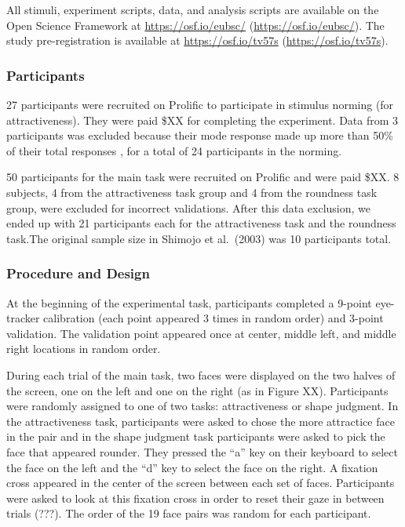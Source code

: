 \documentclass[
  english,
  man,floatsintext]{apa6}
\begin{document}
All stimuli, experiment scripts, data, and analysis scripts are available on the Open Science Framework at \url{https://osf.io/eubsc/} (\url{https://osf.io/eubsc/}). The study pre-registration is available at \url{https://osf.io/tv57s} (\url{https://osf.io/tv57s}).

\hypertarget{participants-5}{%
\subsubsection{Participants}\label{participants-5}}

27 participants were recruited on Prolific to participate in stimulus norming (for attractiveness). They were paid \$XX for completing the experiment. Data from 3 participants was excluded because their mode response made up more than 50\% of their total responses , for a total of 24 participants in the norming.

50 participants for the main task were recruited on Prolific and were paid \$XX. 8 subjects, 4 from the attractiveness task group and 4 from the roundness task group, were excluded for incorrect validations. After this data exclusion, we ended up with 21 participants each for the attractiveness task and the roundness task.The original sample size in Shimojo et al.~(2003) was 10 participants total.

\hypertarget{procedure-and-design}{%
\subsubsection{Procedure and Design}\label{procedure-and-design}}

At the beginning of the experimental task, participants completed a 9-point eye-tracker calibration (each point appeared 3 times in random order) and 3-point validation. The validation point appeared once at center, middle left, and middle right locations in random order.

During each trial of the main task, two faces were displayed on the two halves of the screen, one on the left and one on the right (as in Figure XX). Participants were randomly assigned to one of two tasks: attractiveness or shape judgment. In the attractiveness task, participants were asked to chose the more attractice face in the pair and in the shape judgment task participants were asked to pick the face that appeared rounder. They pressed the ``a'' key on their keyboard to select the face on the left and the ``d'' key to select the face on the right. A fixation cross appeared in the center of the screen between each set of faces. Participants were asked to look at this fixation cross in order to reset their gaze in between trials (???). The order of the 19 face pairs was random for each participant.
\end{document}
